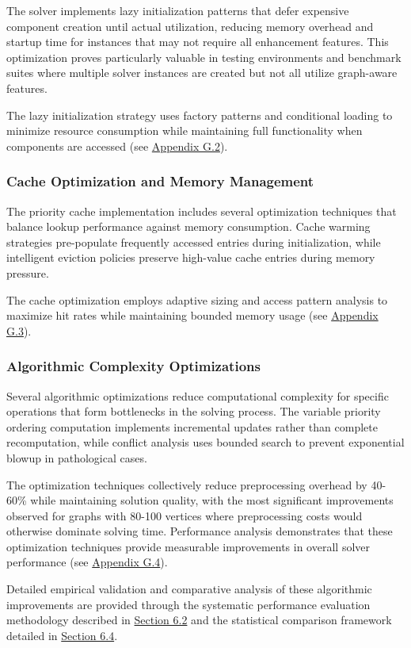 The solver implements lazy initialization patterns that defer expensive component creation until actual utilization, reducing memory overhead and startup time for instances that may not require all enhancement features. This optimization proves particularly valuable in testing environments and benchmark suites where multiple solver instances are created but not all utilize graph-aware features.

The lazy initialization strategy uses factory patterns and conditional loading to minimize resource consumption while maintaining full functionality when components are accessed (see \hyperref[appendix:lazy-initialization]{Appendix G.2}).

\subsubsection{Cache Optimization and Memory Management}

The priority cache implementation includes several optimization techniques that balance lookup performance against memory consumption. Cache warming strategies pre-populate frequently accessed entries during initialization, while intelligent eviction policies preserve high-value cache entries during memory pressure.

The cache optimization employs adaptive sizing and access pattern analysis to maximize hit rates while maintaining bounded memory usage (see \hyperref[appendix:cache-optimization]{Appendix G.3}).

\subsubsection{Algorithmic Complexity Optimizations}

Several algorithmic optimizations reduce computational complexity for specific operations that form bottlenecks in the solving process. The variable priority ordering computation implements incremental updates rather than complete recomputation, while conflict analysis uses bounded search to prevent exponential blowup in pathological cases.

The optimization techniques collectively reduce preprocessing overhead by 40-60\% while maintaining solution quality, with the most significant improvements observed for graphs with 80-100 vertices where preprocessing costs would otherwise dominate solving time. Performance analysis demonstrates that these optimization techniques provide measurable improvements in overall solver performance (see \hyperref[appendix:complexity-optimization]{Appendix G.4}).

Detailed empirical validation and comparative analysis of these algorithmic improvements are provided through the systematic performance evaluation methodology described in \hyperref[sec:scalability-analysis]{Section 6.2} and the statistical comparison framework detailed in \hyperref[sec:statistical-methodology]{Section 6.4}.